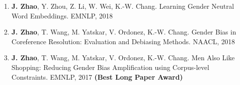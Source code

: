 \documentclass[11pt, a4paper]{article}
\begin{document}
\begin{enumerate}
	\item \textbf{J. Zhao}, Y. Zhou, Z. Li, W. Wei, K.-W. Chang. Learning Gender Neutral Word Embeddings.  EMNLP, 2018
	\item \textbf{J. Zhao}, T. Wang, M. Yatskar, V. Ordonez, K.-W. Chang. Gender Bias in Coreference Resolution: Evaluation and Debiasing Methods.  NAACL, 2018
	\item \textbf{J. Zhao}, T. Wang, M. Yatskar, V. Ordonez, K.-W. Chang. Men Also Like Shopping: Reducing Gender Bias Amplification using Corpus-level Constraints. EMNLP, 2017 {\color{red}\textbf{(Best Long Paper Award)}}
\end{enumerate}

\iffalse
\vspace{0.5em}
\hspace{0.32in}\textbf{Patent}
\begin{enumerate}
	\item 1.	B. Shi, B. Li, \textbf{J. Zhao}. An Algorithm for the Migration of ARM Virtual Machines. Patent Number: 83995027CN0. (submitted)
\end{enumerate}
\fi
\end{document}
